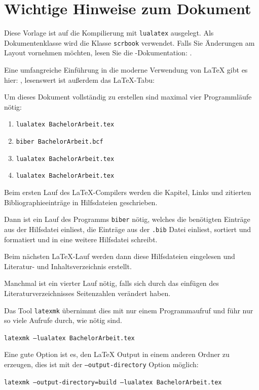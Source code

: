 \section{Wichtige Hinweise zum Dokument}\label{make}

Diese Vorlage ist auf die Kompilierung mit \texttt{lualatex} ausgelegt. 
Als Dokumentenklasse  wird die \KOMAScript\-Klasse \texttt{scrbook} verwendet.
Falls Sie Änderungen am Layout vornehmen möchten, lesen Sie die \KOMAScript-Dokumentation: \cite{koma}.

Eine umfangreiche Einführung in die moderne Verwendung von \LaTeX{} gibt es hier: \cite{toolbox}, lesenswert ist außerdem das \LaTeX-Tabu: \cite{l2tabu}

Um dieses Dokument vollständig zu erstellen sind maximal vier Programmläufe nötig:
\begin{enumerate}[nosep]
    \item \texttt{lualatex BachelorArbeit.tex}
    \item \texttt{biber BachelorArbeit.bcf}
    \item \texttt{lualatex BachelorArbeit.tex}
    \item \texttt{lualatex BachelorArbeit.tex}
\end{enumerate}

Beim ersten Lauf des \LaTeX-Compilers werden die Kapitel, Links und zitierten Bibliographieeinträge in Hilfsdateien geschrieben.

Dann ist ein Lauf des Programms \texttt{biber} nötig, welches die benötigten Einträge aus der Hilfsdatei einliest, die Einträge aus der \texttt{.bib} Datei einliest, sortiert und formatiert und in eine weitere Hilfsdatei schreibt.

Beim nächsten \LaTeX-Lauf werden dann diese Hilfsdateien eingelesen und Literatur- und Inhaltsverzeichnis erstellt.

Manchmal ist ein vierter Lauf nötig, falls sich durch das einfügen des Literaturverzeichnisses Seitenzahlen verändert haben.

Das Tool \texttt{latexmk} übernimmt dies mit nur einem Programmaufruf und
führ nur so viele Aufrufe durch, wie nötig sind.

\texttt{latexmk --lualatex BachelorArbeit.tex}

Eine gute Option ist es, den \LaTeX{} Output in einem anderen 
Ordner zu erzeugen, dies ist mit der \texttt{--output-directory} Option möglich:

\texttt{latexmk --output-directory=build --lualatex BachelorArbeit.tex}


